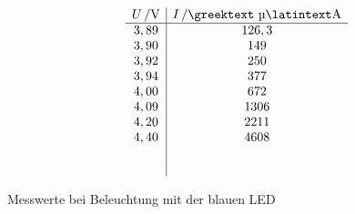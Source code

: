 \documentclass[numbers=noenddot,12pt,a4paper]{scrartcl}
\newcommand{\greek}[1]{\greektext#1\latintext}
\begin{document}
\begin{table}[H]
\begin{align*}
	\begin{array}{c|c}
	\unit[U]{/V} & \unit[I]{/\text{\greek{µ}}A}\\\hline
	3,89 & 126,3 \\
	3,90 & 149 \\
	3,92 & 250 \\
	3,94 & 377 \\
	4,00 & 672 \\
	4,09 & 1306 \\
	4,20 & 2211 \\
	4,40 & 4608 \\
	\, & \, \\
	\, & \, \\
	\end{array}  
\end{align*}
\vspace{-1em}
\caption{Messwerte bei Beleuchtung mit der blauen LED}
\end{table}
\end{document}
